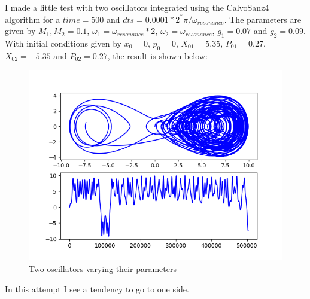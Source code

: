 \documentclass[idxtotoc,hyperref,openany]{labbook} %
\begin{document}
I made a little test with two oscillators integrated using the CalvoSanz4 algorithm for a $time=500$ and $dts=0.0001*2^*\pi / \omega_{resonance}$. The parameters are given by $M_1,M_2=0.1$, $\omega_1=\omega_{resonance}*2$, $\omega_2=\omega_{resonance}$, $g_1=0.07$ and $g_2=0.09$. With initial conditions given by $x_0=0$, $p_0=0$, $X_01=5.35$, $P_01=0.27$, $X_02=-5.35$ and $P_02=0.27$, the result is shown below:
\begin{figure}[H] %
\begin{center}
\includegraphics[width=1\linewidth]{dos_osci.png}
\end{center}
\caption{Two oscillators varying their parameters}
\label{Two_osci_first}
\end{figure}

In this attempt I see a tendency to go to one side.
\end{document}
